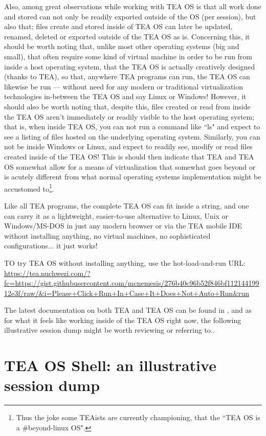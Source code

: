 \documentclass{article}
\begin{document}
Also, among great observations while working with TEA OS is that all work done and stored can not only be readily exported outside of the OS (per session), but also that; files create and stored inside of TEA OS can later be updated, renamed, deleted or exported outside of the TEA OS as is. Concerning this, it should be worth noting that, unlike most other operating systems (big and small), that often require some kind of virtual machine in order to be run from inside a host operating system, that the TEA OS is actually creatively designed (thanks to TEA), so that, anywhere TEA programs can run, the TEA OS can likewise be run --- without need for any modern or traditional virtualization technologies in-between the TEA OS and say Linux or Windows! However, it should also be worth noting that, despite this, files created or read from inside the TEA OS aren't immediately or readily visible to the host operating system; that is, when inside TEA OS, you can not run a command like ``ls" and expect to see a listing of files hosted on the underlying operating system. Similarly, you can not be inside Windows or Linux, and expect to readily see, modify or read files created inside of the TEA OS! This is should then indicate that TEA and TEA OS somewhat allow for a means of virtualization that somewhat goes beyond or is acutely different from what normal operating systems implementation might be accustomed to\footnote{Thus the joke some TEAists are currently championing, that the ``TEA OS is a \#beyond-linux OS".}.

Like all TEA programs, the complete TEA OS can fit inside a string, and one can carry it as a lightweight, easier-to-use alternative to Linux, Unix or Windows/MS-DOS in just any modern browser or via the TEA mobile IDE without installing anything, no virtual machines, no sophisticated configurations... it just works! 

TO try TEA OS without installing anything, use the hot-load-and-run URL: \url{https://tea.nuchwezi.com/?fc=https://gist.githubusercontent.com/mcnemesis/276b40c96b52f846bf11214419912e3f/raw/&i=Please+Click+Run+In+Case+It+Does+Not+Auto+Run&run}

The latest documentation on both TEA and TEA OS can be found in \cite{Lutalo2024TEATAZ}, and as for what it feels like working inside of the TEA OS right now, the following illustrative session dump might be worth reviewing or referring to..

\section{TEA OS Shell: an illustrative session dump}
\label{SECTOSDump}
\end{document}
